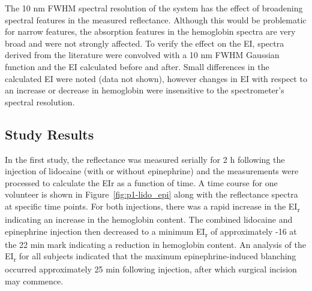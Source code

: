 The 10 nm FWHM spectral resolution of the system has the effect of broadening spectral features in the measured reflectance. Although this would be problematic for narrow features, the absorption features in the hemoglobin spectra are very broad and were not strongly affected. To verify the effect on the EI, spectra derived from the literature\cite{Jacques1998} were convolved with a 10 nm FWHM Gaussian function and the EI calculated before and after. Small differences in the calculated EI were noted (data not shown), however changes in EI with respect to an increase or decrease in hemoglobin were insensitive to the spectrometer’s spectral resolution.

\subsection{Study Results}
In the first study, the reflectance was measured serially for 2 h following the injection of lidocaine (with or without epinephrine) and the measurements were processed to calculate the EIr as a function of time. A time course for one volunteer is shown in Figure~\ref{fig:p1-lido_epi} along with the reflectance spectra at specific time points. For both injections, there was a rapid increase in the EI\textsubscript{r} indicating an increase in the hemoglobin content. The combined lidocaine and epinephrine injection then decreased to a minimum EI\textsubscript{r} of approximately -16 at the 22 min mark indicating a reduction in hemoglobin content. An analysis of the EI\textsubscript{r} for all subjects indicated that the maximum epinephrine-induced blanching occurred approximately 25 min following injection, after which surgical incision may commence.\cite{McKee2013}

